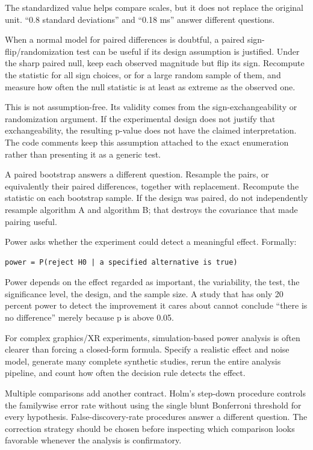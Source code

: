 The standardized value helps compare scales, but it does not replace the original unit. ``0.8 standard deviations'' and ``0.18 ms'' answer different questions.

When a normal model for paired differences is doubtful, a paired sign-flip/randomization test can be useful if its design assumption is justified. Under the sharp paired null, keep each observed magnitude but flip its sign. Recompute the statistic for all sign choices, or for a large random sample of them, and measure how often the null statistic is at least as extreme as the observed one.

This is not assumption-free. Its validity comes from the sign-exchangeability or randomization argument. If the experimental design does not justify that exchangeability, the resulting p-value does not have the claimed interpretation. The code comments keep this assumption attached to the exact enumeration rather than presenting it as a generic test.

A paired bootstrap answers a different question. Resample the pairs, or equivalently their paired differences, together with replacement. Recompute the statistic on each bootstrap sample. If the design was paired, do not independently resample algorithm A and algorithm B; that destroys the covariance that made pairing useful.

Power asks whether the experiment could detect a meaningful effect. Formally:

\begin{verbatim}
power = P(reject H0 | a specified alternative is true)
\end{verbatim}

Power depends on the effect regarded as important, the variability, the test, the significance level, the design, and the sample size. A study that has only 20 percent power to detect the improvement it cares about cannot conclude ``there is no difference'' merely because p is above 0.05.

For complex graphics/XR experiments, simulation-based power analysis is often clearer than forcing a closed-form formula. Specify a realistic effect and noise model, generate many complete synthetic studies, rerun the entire analysis pipeline, and count how often the decision rule detects the effect.

Multiple comparisons add another contract. Holm's step-down procedure controls the familywise error rate without using the single blunt Bonferroni threshold for every hypothesis. False-discovery-rate procedures answer a different question. The correction strategy should be chosen before inspecting which comparison looks favorable whenever the analysis is confirmatory.

